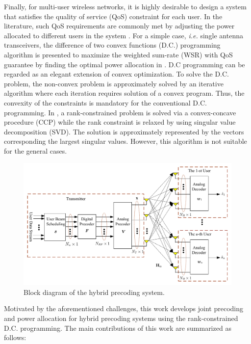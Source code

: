 \documentclass[10pt,journal,twocolumn,twoside]{IEEEtran}
\begin{document}
Finally, for multi-user wireless networks, it is highly desirable to design a system that satisfies the quality of service (QoS) constraint for each user. In the literature, such QoS requirements are commonly met by adjusting the power allocated to different users in the system \cite{palomar2004optimum}. For a simple case, \textit{i.e.} single antenna transceivers, the difference of two convex functions (D.C.) programming algorithm is presented to maximize the weighted sum-rate (WSR) with QoS guarantee by finding the optimal power allocation in \cite{kha2012fast}. D.C programming can be regarded as an elegant extension of convex optimization. To solve the D.C. problem, the non-convex problem is approximately solved by an iterative algorithm where each iteration requires solution of a convex program. Thus, the convexity of the constraints is mandatory for the conventional D.C. programming. In \cite{hu2018joint}, a rank-constrained problem is solved via a convex-concave procedure (CCP) while the rank constraint is relaxed by using singular value decomposition (SVD). The solution is approximately represented by the vectors corresponding the largest singular values. However, this algorithm is not suitable for the general cases.

\begin{figure}[ht]
	\begin{center}
		\includegraphics[scale=0.55]{Figure/SystemSchematic_new.pdf}
		\caption{Block diagram of the hybrid precoding system.}\label{fig:BlockDiagram}
	\end{center}
\end{figure}


Motivated by the aforementioned challenges, this work develops joint precoding and power allocation for hybrid precoding systems using the rank-constrained D.C. programming. The main contributions of this work are summarized as follows:
\end{document}
